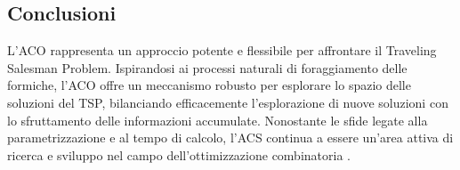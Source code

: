 \subsection{Conclusioni}

L'\Gls{ACO} rappresenta un approccio potente e flessibile per affrontare il Traveling Salesman Problem. Ispirandosi ai processi naturali di foraggiamento delle formiche, l'\Gls{ACO} offre un meccanismo robusto per esplorare lo spazio delle soluzioni del \Gls{TSP}, bilanciando efficacemente l'esplorazione di nuove soluzioni con lo sfruttamento delle informazioni accumulate. Nonostante le sfide legate alla parametrizzazione e al tempo di calcolo, l'\Gls{ACS} continua a essere un'area attiva di ricerca e sviluppo nel campo dell'ottimizzazione combinatoria \cite{dorigo2010ant}.
